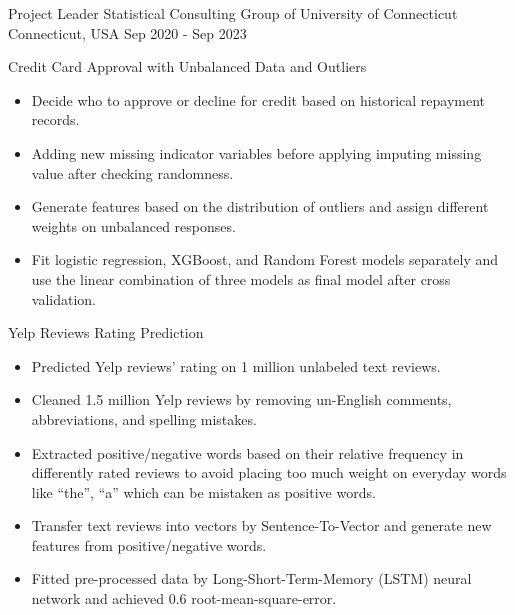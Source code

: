 \begin{cventries}
  
  \cventry
    {Project Leader} %
    {Statistical Consulting Group of University of Connecticut} %
    {Connecticut, USA} %
    {Sep 2020 - Sep 2023} %
    {
      \begin{cvitems}
        \item Credit Card Approval with Unbalanced Data and Outliers 
        \begin{itemize}
          \item Decide who to approve or decline for credit based on historical repayment records.
          \item Adding new missing indicator variables before applying imputing missing value after checking randomness. 
          \item Generate features based on the distribution of outliers and assign different weights on unbalanced responses.
          \item Fit logistic regression, XGBoost, and Random Forest models separately and use the linear combination of three models as final model after cross validation.
        \end{itemize}
        \item Yelp Reviews Rating Prediction
        \begin{itemize}
          \item Predicted Yelp reviews’ rating on 1 million unlabeled text reviews.
          \item Cleaned 1.5 million Yelp reviews by removing un-English comments, abbreviations, and spelling mistakes. 
          \item Extracted positive/negative words based on their relative frequency in differently rated reviews to avoid placing too much weight on everyday words like “the”, “a” which can be mistaken as positive words.
          \item	Transfer text reviews into vectors by Sentence-To-Vector and generate new features from positive/negative words.
          \item Fitted pre-processed data by Long-Short-Term-Memory (LSTM) neural network and achieved 0.6 root-mean-square-error.
        \end{itemize}
      \end{cvitems}
    }


\end{cventries}
